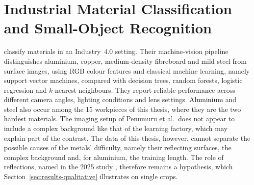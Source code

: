 \section{Industrial Material Classification and Small-Object Recognition}
\label{sec:related-work-industrial}

\citet{penumuru2020material} classify materials in an Industry~4.0
setting. Their machine-vision pipeline distinguishes aluminium, copper, medium-density
fibreboard and mild steel from surface images, using RGB colour features and classical
machine learning, namely support vector machines, compared with decision trees, random
forests, logistic regression and $k$-nearest neighbours. They report reliable
performance across different camera angles, lighting conditions and lens settings.
Aluminium and steel also occur among the 15 workpieces of this thesis, where they are
the two hardest materials. The imaging setup of Penumuru et al.\ does not appear to
include a complex background like that of the learning factory, which may explain part
of the contrast. The data of this thesis, however, cannot separate the possible causes
of the metals' difficulty, namely their reflecting surfaces, the complex background and,
for aluminium, the training length. The role of reflections, named in the 2025
study \citep{schneidereitYOLOv8}, therefore remains a hypothesis, which
Section~\ref{sec:results-qualitative} illustrates on single crops.

